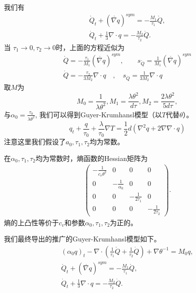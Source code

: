 我们有
\begin{eqnarray*}
\mathring{{Q}}_t+(\mathring{\nabla {q}})^{sym}=-\frac{M_1}{\tau_1}\mathring{{Q}}, \\
\dot{Q}_t+\frac{1}{3} \nabla \cdot {q}=-\frac{M_2}{\tau_2}\dot{Q}.
\end{eqnarray*}
当 $\tau_1 \to 0, \tau_2 \to 0$时，上面的方程近似为
\begin{eqnarray*} 
\mathring{{Q}}=-\frac{\tau_1}{M_1}(\mathring{\nabla {q}})^{sym} ,\quad  \quad s_{\mathring{Q}}=\frac{1}{M_1}(\mathring{\nabla {q}})^{sym} \\
\dot{Q}=-\frac{\tau_2}{3M_2}\nabla \cdot {q} \quad , \quad s_{\dot{Q}}=\frac{1}{3M_2} \nabla \cdot {q}
\end{eqnarray*}
取$M$为
\begin{equation}
M_0=\frac{1}{\lambda \theta^2}, M_1=\frac{\lambda \theta^2}{d\tau}, M_2=\frac{2\lambda \theta^2}{5d\tau},
\end{equation}
与$\alpha_0=\frac{\tau_0}{\lambda \theta^2}$,
我们可以得到Guyer-Krumhansl模型（以$T$代替$\theta$）\cite{jou1996extended}。
\begin{equation}
{q}_t+\frac{{q}}{\tau_0}+\frac{\lambda}{\tau_0}\nabla T=\frac{1}{2}d(\nabla^2 {q}+2\nabla \nabla \cdot {q})
\end{equation}
注意这里我们假设了$a_0,\tau_1,\tau_2$均为常数。

在$\alpha_0,\tau_1,\tau_2$均为常数时，熵函数的Hessian矩阵为
\begin{eqnarray*}
\left(\begin{array}{llll}  -\frac{1}{c_v \theta^2} & 0 & 0 & 0 \\
                                           0  & -\frac{1}{\alpha_0} & 0 & 0 \\
										   0 & 0 & -\frac{1}{2\tau_1} & 0 \\
										   0 & 0 & 0 & -\frac{1}{2\tau_2}
										   \end{array} \right).
\end{eqnarray*}
熵的上凸性等价于$c_v$和参数$\alpha_0,\tau_1,\tau_2$为正的。

我们最终导出的推广的Guyer-Krumhansl模型如下。
\begin{subequations}\label{eq:EGK}
	\begin{align}
(\alpha_0 {q})_t - \nabla \cdot ({\frac{1}{\tau_1} \mathring{{Q}}}+\frac{1}{\tau_2}\dot{Q})+\nabla \theta^{-1} = M_0 {q}, \\
\mathring{{Q}}_t+(\mathring{\nabla {q}})^{sym}=-\frac{M_1}{\tau_1}\mathring{{Q}}, \\
\dot{Q}_t+\frac{1}{3} \nabla \cdot {q}=-\frac{M_2}{\tau_2} \dot{Q}.
	\end{align}
\end{subequations}

